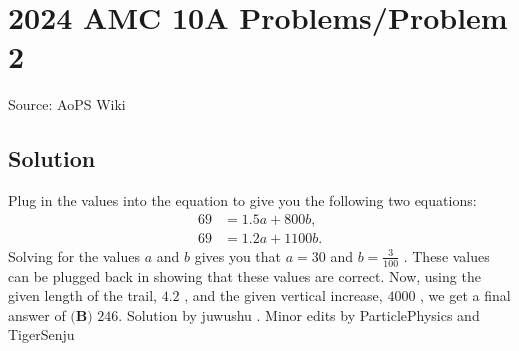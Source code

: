 \documentclass[12pt]{article}
\begin{document}
\section*{{2024 AMC 10A Problems/Problem 2}}
Source: AoPS Wiki

\subsection*{Solution}
Plug in the values into the equation to give you the following two equations:
\begin{align*}
69&=1.5a+800b, \\
69&=1.2a+1100b.
\end{align*}
Solving for the values $a$ and $b$ gives you that $a=30$ and $b=\frac{3}{100}$ . These values can be plugged back in showing that these values are correct.
Now, using the given length of the trail, $4.2$ , and the given vertical increase, $4000$ , we get a final answer of $\boxed{\textbf{(B) }246}.$ Solution by juwushu . Minor edits by ParticlePhysics and TigerSenju
\end{document}
